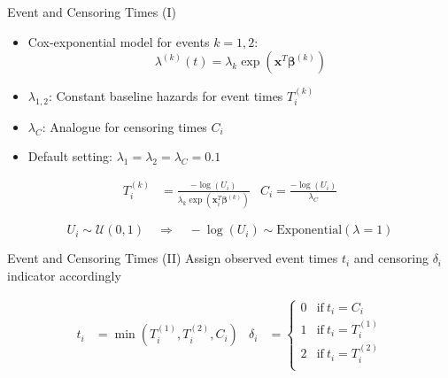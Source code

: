 \documentclass{beamer}
\providecommand{\tightlist}{%
  \setlength{\itemsep}{0pt}\setlength{\parskip}{0pt}}
\begin{document}
\begin{frame}{Event and Censoring Times (I)}
\protect\hypertarget{event-and-censoring-times-i}{}
\begin{itemize}
\tightlist
\item
  Cox-exponential model for events \(k = 1,2\):
  \[\lambda^{(k)}(t) = \lambda_k \exp(\mathbf{x}^T \pmb{\beta}^{(k)})\]
\item
  \(\lambda_{1,2}\): Constant baseline hazards for event times
  \(T_i^{(k)}\)
\item
  \(\lambda_C\): Analogue for censoring times \(C_i\)
\item
  Default setting: \(\lambda_1 = \lambda_2 = \lambda_C = 0.1\)
\end{itemize}

\begin{align*}
T_i^{(k)} &= \frac{-\log(U_i)}{\lambda_k \exp(\mathbf{x}^{T}_i\pmb{\beta}^{(k)})} &
C_i       = \frac{-\log(U_i)}{\lambda_C}
\end{align*}

\[U_i \sim \mathcal{U}(0, 1) \quad \Longrightarrow \quad  -\log(U_i) \sim \mathrm{Exponential}(\lambda = 1)\]
\end{frame}

\begin{frame}{Event and Censoring Times (II)}
\protect\hypertarget{event-and-censoring-times-ii}{}
Assign observed event times \(t_i\) and censoring \(\delta_i\) indicator
accordingly

\begin{align*}
t_i &= \min(T_i^{(1)}, T_i^{(2)}, C_i) & 
\delta_i &= \begin{cases}
  0 & \text{if}\ t_i = C_i \\
  1 & \text{if}\ t_i = T_i^{(1)} \\
  2 & \text{if}\ t_i = T_i^{(2)} \\
  \end{cases}
\end{align*}
\end{frame}
\end{document}
